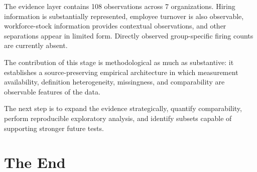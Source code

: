 \documentclass[a4paper,10pt]{article}
\begin{document}
The evidence layer contains 108 observations across 7 organizations. Hiring information is substantially represented, employee turnover is also observable, workforce-stock information provides contextual observations, and other separations appear in limited form. Directly observed group-specific firing counts are currently absent.

The contribution of this stage is methodological as much as substantive: it establishes a source-preserving empirical architecture in which measurement availability, definition heterogeneity, missingness, and comparability are observable features of the data.

The next step is to expand the evidence strategically, quantify comparability, perform reproducible exploratory analysis, and identify subsets capable of supporting stronger future tests.

\section*{The End}
\end{document}
